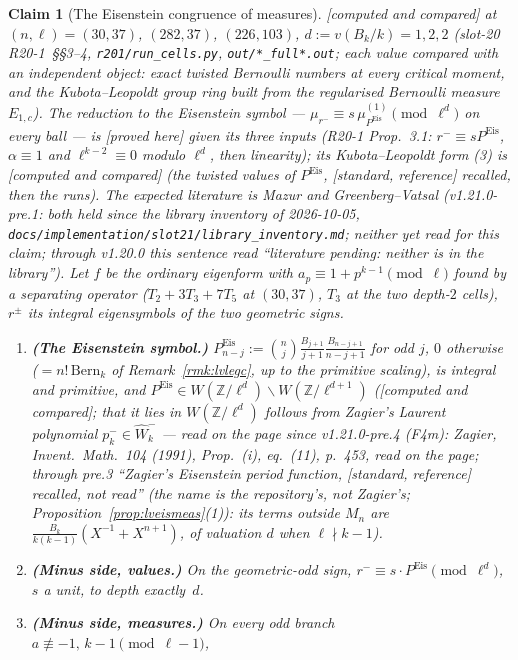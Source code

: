 \documentclass[11pt]{article}
\newtheorem{claim}[theorem]{Claim}
\theoremstyle{remark}
\newcommand{\Z}{\mathbb{Z}}
\newcommand{\Mn}{M_n}
\newcommand{\PROVED}{\textsf{[proved here]}}
\newcommand{\STD}{\textsf{[standard, reference]}}
\newcommand{\CMPD}{\textsf{[computed and compared]}}   %
\begin{document}
\begin{claim}[The Eisenstein congruence of measures]\label{cl:lvmeascong}
\CMPD{} at $(n,\ell)=(30,37)$, $(282,37)$, $(226,103)$, $d:=v(B_k/k)=1,2,2$ (slot-20 R20-1~\S\S3--4, \texttt{r201/run\_cells.py}, \texttt{out/*\_full*.out}; each value compared with an
independent object: exact twisted Bernoulli numbers at every critical moment, and the Kubota--Leopoldt group ring built from the regularised Bernoulli measure $E_{1,c}$). The
reduction to the Eisenstein symbol --- $\mu_{r^{-}}\equiv s\,\mu^{(1)}_{P^{\mathrm{Eis}}}\pmod{\ell^{d}}$ on every ball --- is \PROVED{} given its three inputs (R20-1 Prop.~3.1: $r^{-}\equiv sP^{\mathrm{Eis}}$,
$\alpha\equiv1$ and $\ell^{k-2}\equiv0$ modulo $\ell^{d}$, then linearity); its Kubota--Leopoldt form (3) is \CMPD{} (the twisted values of $P^{\mathrm{Eis}}$, \STD{} recalled, then the runs). The expected
literature is Mazur and Greenberg--Vatsal (v1.21.0-pre.1: both held since the library inventory of 2026-10-05, \texttt{docs/implementation/slot21/library\_inventory.md}; neither yet read for this claim; through v1.20.0 this sentence read ``literature pending: neither is in the library''). Let $f$ be the ordinary eigenform with
$a_p\equiv1+p^{k-1}\pmod\ell$ found by a separating operator ($T_2+3T_3+7T_5$ at $(30,37)$, $T_3$ at the two depth-$2$ cells), $r^{\pm}$ its integral eigensymbols of the
two geometric signs.
\begin{enumerate}
\item \textbf{(The Eisenstein symbol.)} $P^{\mathrm{Eis}}_{n-j}:=\binom nj\frac{B_{j+1}}{j+1}\frac{B_{n-j+1}}{n-j+1}$ for odd $j$, $0$ otherwise ($=n!\,\mathrm{Bern}_k$ of
  Remark~\ref{rmk:lvlegc}, up to the primitive scaling), is integral and primitive, and $P^{\mathrm{Eis}}\in W(\Z/\ell^{d})\smallsetminus W(\Z/\ell^{d+1})$ (\CMPD; that it lies in
  $W(\Z/\ell^{d})$ follows from Zagier's Laurent polynomial $p_k^{-}\in\hat W_k^{-}$ --- read on the page since v1.21.0-pre.4 (F4m): Zagier, Invent.\ Math.\ 104 (1991), Prop.~(i), eq.~(11), p.~453,
  read on the page; through pre.3 ``Zagier's Eisenstein period function, \STD{} recalled, not read'' (the name is the repository's, not Zagier's; Proposition~\ref{prop:lveismeas}(1)): its terms outside $\Mn$ are $\frac{B_k}{k(k-1)}(X^{-1}+X^{n+1})$, of valuation $d$ when
  $\ell\nmid k-1$).
\item \textbf{(Minus side, values.)} On the geometric-odd sign, $r^{-}\equiv s\cdot P^{\mathrm{Eis}}\pmod{\ell^{d}}$, $s$ a unit, to depth exactly~$d$.
\item \textbf{(Minus side, measures.)} On every odd branch $a\not\equiv-1,\,k-1\pmod{\ell-1}$,

\end{enumerate}
\end{claim}
\end{document}
